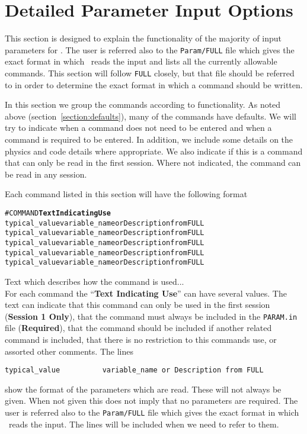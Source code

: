 \section{Detailed Parameter Input Options \label{section:param_details}}

This section is designed to explain the functionality of the majority of
input parameters for \BATSRUS.  The user is referred also to the {\tt Param/FULL}
file which gives the exact format in which \BATSRUS\ reads the input and lists 
all the currently allowable commands. This section will follow {\tt FULL}
closely, but that file should be referred to in order to determine the
exact format in which a command should be written.

In this section we group the commands according to functionality.  As noted
above (section~\ref{section:defaults}),
 many of the commands have defaults.  We will try to indicate when a command
does not need to be entered and when a command is required to be entered.
In addition, we include some details on the physics and code details where
appropriate.  We also indicate if this is a command that can only be read in
the first session.  Where not indicated, the command can be read in any session.

Each command listed in this section will have the following format

\begin{alltt}
#COMMAND      \hfill {\bf Text Indicating Use}
typical_value          variable_name or Description from FULL
typical_value          variable_name or Description from FULL
typical_value          variable_name or Description from FULL
typical_value          variable_name or Description from FULL
typical_value          variable_name or Description from FULL
\end{alltt}

Text which describes how the command is used...
\ \ \\
 
For each command the ``{\bf Text Indicating Use}'' can have several values.
The text can indicate that this command can only be used in the first
session ({\bf Session 1 Only}),
that the command must always be included in the {\tt PARAM.in} file ({\bf Required}),
that the command should be included if another related command is included, 
 that there is no restriction to
this commands use, or assorted other comments.
The lines 
\begin{verbatim}
typical_value          variable_name or Description from FULL
\end{verbatim}
show the format of the parameters which are read.  These will not always be
given.  When not given this does not imply that no parameters are required.
The user is referred also to the {\tt Param/FULL}
file which gives the exact format in which \BATSRUS\ reads the input.
The lines will be included when we need to refer to them.

